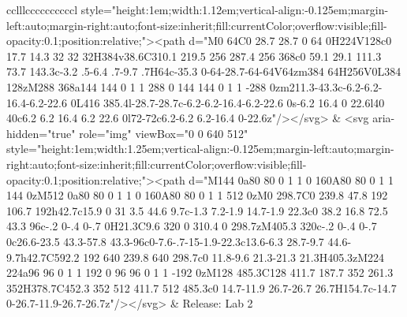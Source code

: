 \documentclass[
]{article}
\begin{document}
\begin{figure*}
\begin{longtable*}{cclllccccccccccl}
style="height:1em;width:1.12em;vertical-align:-0.125em;margin-left:auto;margin-right:auto;font-size:inherit;fill:currentColor;overflow:visible;fill-opacity:0.1;position:relative;"><path d="M0 64C0 28.7 28.7 0 64 0H224V128c0 17.7 14.3 32 32 32H384v38.6C310.1 219.5 256 287.4 256 368c0 59.1 29.1 111.3 73.7 143.3c-3.2 .5-6.4 .7-9.7 .7H64c-35.3 0-64-28.7-64-64V64zm384 64H256V0L384 128zM288 368a144 144 0 1 1 288 0 144 144 0 1 1 -288 0zm211.3-43.3c-6.2-6.2-16.4-6.2-22.6 0L416 385.4l-28.7-28.7c-6.2-6.2-16.4-6.2-22.6 0s-6.2 16.4 0 22.6l40 40c6.2 6.2 16.4 6.2 22.6 0l72-72c6.2-6.2 6.2-16.4 0-22.6z"/></svg> & <svg aria-hidden="true" role="img" viewBox="0 0 640 512" style="height:1em;width:1.25em;vertical-align:-0.125em;margin-left:auto;margin-right:auto;font-size:inherit;fill:currentColor;overflow:visible;fill-opacity:0.1;position:relative;"><path d="M144 0a80 80 0 1 1 0 160A80 80 0 1 1 144 0zM512 0a80 80 0 1 1 0 160A80 80 0 1 1 512 0zM0 298.7C0 239.8 47.8 192 106.7 192h42.7c15.9 0 31 3.5 44.6 9.7c-1.3 7.2-1.9 14.7-1.9 22.3c0 38.2 16.8 72.5 43.3 96c-.2 0-.4 0-.7 0H21.3C9.6 320 0 310.4 0 298.7zM405.3 320c-.2 0-.4 0-.7 0c26.6-23.5 43.3-57.8 43.3-96c0-7.6-.7-15-1.9-22.3c13.6-6.3 28.7-9.7 44.6-9.7h42.7C592.2 192 640 239.8 640 298.7c0 11.8-9.6 21.3-21.3 21.3H405.3zM224 224a96 96 0 1 1 192 0 96 96 0 1 1 -192 0zM128 485.3C128 411.7 187.7 352 261.3 352H378.7C452.3 352 512 411.7 512 485.3c0 14.7-11.9 26.7-26.7 26.7H154.7c-14.7 0-26.7-11.9-26.7-26.7z"/></svg> & Release: Lab 2 \\ 

\end{longtable*}
\end{figure*}
\end{document}
